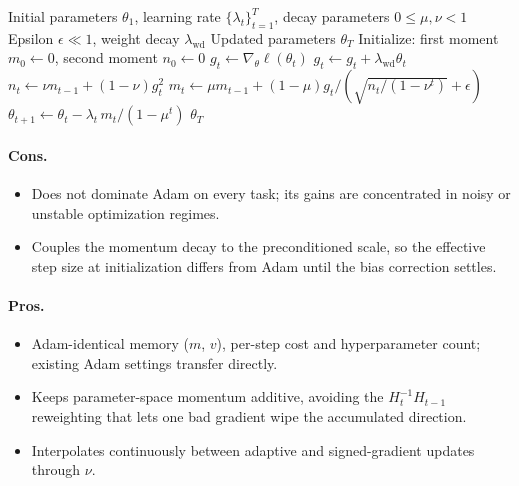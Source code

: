 \begin{algorithm}[H]
\caption{LaProp}
\label{alg:laprop}
\begin{algorithmic}[1]
\Require Initial parameters $\theta_1$, learning rate $\{\lambda_t\}_{t=1}^T$, decay parameters $0 \le \mu, \nu < 1$
\Require Epsilon $\epsilon \ll 1$, weight decay $\lambda_{\mathrm{wd}}$
\Ensure Updated parameters $\theta_T$
\State Initialize: first moment $m_0 \gets 0$, second moment $n_0 \gets 0$
    \State $g_t \gets \nabla_\theta \ell(\theta_t)$
        \State $g_t \gets g_t + \lambda_{\mathrm{wd}} \theta_t$ 
    \EndIf
    \State $n_t \gets \nu n_{t-1} + (1-\nu) g_t^2$
    \State $m_t \gets \mu m_{t-1} + (1-\mu) g_t / (\sqrt{n_t/(1-\nu^t)} + \epsilon)$
    \State $\theta_{t+1} \gets \theta_t - \lambda_t\, m_t / (1-\mu^t)$
\EndFor
\Return $\theta_T$
\end{algorithmic}
\end{algorithm}

\paragraph{Cons.}
\begin{itemize}[leftmargin=*]
\item Does not dominate Adam on every task; its gains are concentrated in noisy or unstable optimization regimes.
\item Couples the momentum decay to the preconditioned scale, so the effective step size at initialization differs from Adam until the bias correction settles.
\end{itemize}

\paragraph{Pros.}
\begin{itemize}[leftmargin=*]
\item Adam-identical memory ($m$, $v$), per-step cost and hyperparameter count; existing Adam settings transfer directly.
\item Keeps parameter-space momentum additive, avoiding the $H_t^{-1}H_{t-1}$ reweighting that lets one bad gradient wipe the accumulated direction.
\item Interpolates continuously between adaptive and signed-gradient updates through $\nu$.
\end{itemize}
